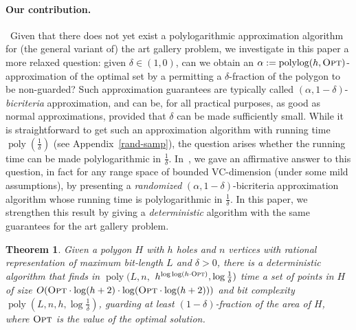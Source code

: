 \documentclass[a4paper,11pt]{article}
\newtheorem{theorem}{Theorem}
\newcommand{\poly}{\operatorname{poly}}
\newcommand{\polylog}{\operatorname{polylog}}
\def \OPT {\textsc{Opt}}
\begin{document}
\paragraph{Our contribution.}~Given that there does not yet exist a polylogarithmic approximation algorithm for (the general variant of) the art gallery problem, we investigate in this paper a more relaxed question: given $\delta\in(1,0)$, can we obtain an $\alpha:=\polylog(h,\OPT)$-approximation of the optimal set by a permitting a $\delta$-fraction of the polygon to be non-guarded? Such approximation guarantees are typically called $(\alpha,1-\delta)$-{\it bicriteria} approximation, and can be, for all practical purposes, as good as normal approximations, provided that $\delta$ can be made sufficiently small. While it is straightforward to get such an approximation algorithm with running time $\poly(\frac1\delta)$ (see Appendix~\ref{rand-samp}), the question arises  whether the running time can be made polylogarithmic in $\frac1\delta$.  In~\cite{E17,E23}, we gave an affirmative answer to this question, in fact for any range space of bounded VC-dimension (under some mild assumptions), by presenting a {\it randomized} $(\alpha,1-\delta)$-bicriteria approximation algorithm whose running time is polylogarithmic in $\frac1\delta$. In this paper, we strengthen this result by giving a {\it deterministic}  algorithm with the same guarantees for the art gallery problem. 
\begin{theorem}\label{t1}
	Given a polygon $H$ with  $h$ holes and $n$ vertices with rational representation of maximum bit-length $L$ and $\delta>0$, there is a deterministic algorithm that finds in $\poly(L,n,$ $h^{\log\log (h\cdot\OPT)},\log\frac{1}{\delta})$ time a set of points in $H$ of size $O(\OPT\cdot\log(h+2)\cdot\log (\OPT\cdot\log(h+2)))$ and bit complexity $\poly(L,n,h,\log\frac{1}{\delta})$, guarding at least $(1-\delta)$-fraction of the area of $H$, where $\OPT$ is the value of the optimal solution. 
\end{theorem}
\end{document}
